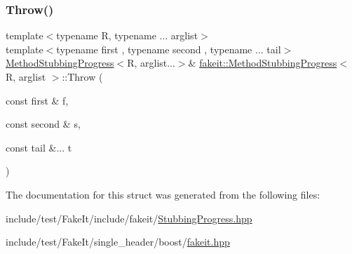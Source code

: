 \mbox{\label{structfakeit_1_1MethodStubbingProgress_a516a0ade529c61e4ab6df1bf47f3f1b2}} 
\subsubsection{\texorpdfstring{Throw()}{Throw()}\hspace{0.1cm}{\footnotesize\ttfamily [27/27]}}
{\footnotesize\ttfamily template$<$typename R, typename ... arglist$>$ \\
template$<$typename first , typename second , typename ... tail$>$ \\
\mbox{\hyperlink{structfakeit_1_1MethodStubbingProgress}{Method\+Stubbing\+Progress}}$<$R, arglist...$>$\& \mbox{\hyperlink{structfakeit_1_1MethodStubbingProgress}{fakeit\+::\+Method\+Stubbing\+Progress}}$<$ R, arglist $>$\+::Throw (\begin{DoxyParamCaption}\item[{const first \&}]{f,  }\item[{const second \&}]{s,  }\item[{const tail \&...}]{t }\end{DoxyParamCaption})\hspace{0.3cm}{\ttfamily [inline]}}



The documentation for this struct was generated from the following files\+:\begin{DoxyCompactItemize}
\item 
include/test/\+Fake\+It/include/fakeit/\mbox{\hyperlink{StubbingProgress_8hpp}{Stubbing\+Progress.\+hpp}}\item 
include/test/\+Fake\+It/single\+\_\+header/boost/\mbox{\hyperlink{single__header_2boost_2fakeit_8hpp}{fakeit.\+hpp}}\end{DoxyCompactItemize}
